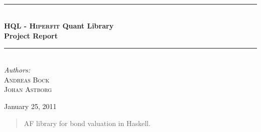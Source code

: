 \documentclass[a4paper,11pt]{scrreprt}
\def\Title{\bf HQL - \textsc{Hiperfit} Quant Library\\ {\Large Project Report}}
\newcommand{\HRule}{\rule{\linewidth}{0.5mm}}
\begin{document}
\begin{titlepage}

\textsc{\LARGE }\\[1.5cm]
\textsc{\Large }\\[0.5cm]
\textsc{\large }\\[0.5cm]
 
\begin{center}
\HRule \\[0.5cm]
\huge \bfseries \Title\\[0.5cm]
\HRule \\[0.5cm]

\Large
\emph{Authors:}\\
\textsc{Andreas Bock \\ Johan Astborg }\\[3cm]


\date{\today}



{\large January 25, 2011}\\[4cm]
 
\vfill
\end{center}

\end{titlepage}
\begin{abstract}

AF library for bond valuation in Haskell.
\end{abstract}
\tableofcontents
\listoftables
{}
\listoffigures














\printglossary[type=main,title={Glossary},toctitle={Glossary}]
\thispagestyle{empty}\cleardoublepage
\printglossary[type=\acronymtype,title={List of Abbreviations},toctitle={List of Abbreviations}]

\appendix




\end{document}
